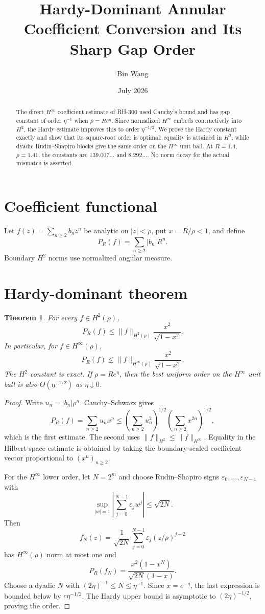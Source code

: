 \documentclass[11pt]{article}
\title{Hardy-Dominant Annular Coefficient Conversion and Its Sharp Gap Order}
\author{Bin Wang}\date{July 2026}
\newtheorem{theorem}{Theorem}[section]
\theoremstyle{remark}\newtheorem{remark}[theorem]{Remark}
\begin{document}
\maketitle
\begin{abstract}
The direct $H^\infty$ coefficient estimate of RH-300 used Cauchy's bound and
has gap constant of order $\eta^{-1}$ when $\rho=Re^\eta$.  Since normalized
$H^\infty$ embeds contractively into $H^2$, the Hardy estimate improves this
to order $\eta^{-1/2}$.  We prove the Hardy constant exactly and show that
its square-root order is optimal: equality is attained in $H^2$, while
dyadic Rudin--Shapiro blocks give the same order on the $H^\infty$ unit ball.
At $R=1.4$, $\rho=1.41$, the constants are $139.007\ldots$ and
$8.292\ldots$.  No norm decay for the actual mismatch is asserted.
\end{abstract}

\section{Coefficient functional}
Let $f(z)=\sum_{n\ge2}b_nz^n$ be analytic on $|z|<\rho$, put
$x=R/\rho<1$, and define
\[
 P_R(f)=\sum_{n\ge2}|b_n|R^n.
\]
Boundary $H^2$ norms use normalized angular measure.

\section{Hardy-dominant theorem}
\begin{theorem}\label{thm:hardy}
For every $f\in H^2(\rho)$,
\[
 P_R(f)\le
 \|f\|_{H^2(\rho)}\frac{x^2}{\sqrt{1-x^2}}.
\]
In particular, for $f\in H^\infty(\rho)$,
\[
 P_R(f)\le
 \|f\|_{H^\infty(\rho)}\frac{x^2}{\sqrt{1-x^2}}.
\]
The $H^2$ constant is exact.  If $\rho=Re^\eta$, then the best uniform
order on the $H^\infty$ unit ball is also $\Theta(\eta^{-1/2})$ as
$\eta\downarrow0$.
\end{theorem}
\begin{proof}
Write $u_n=|b_n|\rho^n$.  Cauchy--Schwarz gives
\[
 P_R(f)=\sum_{n\ge2}u_nx^n
 \le\left(\sum_{n\ge2}u_n^2\right)^{1/2}
 \left(\sum_{n\ge2}x^{2n}\right)^{1/2},
\]
which is the first estimate.  The second uses
$\|f\|_{H^2}\le\|f\|_{H^\infty}$.  Equality in the Hilbert-space estimate
is obtained by taking the boundary-scaled coefficient vector proportional
to $(x^n)_{n\ge2}$.

For the $H^\infty$ lower order, let $N=2^m$ and choose Rudin--Shapiro signs
$\varepsilon_0,\ldots,\varepsilon_{N-1}$ with
\[
 \sup_{|w|=1}\left|\sum_{j=0}^{N-1}\varepsilon_jw^j\right|
 \le\sqrt{2N}.
\]
Then
\[
 f_N(z)=\frac1{\sqrt{2N}}
 \sum_{j=0}^{N-1}\varepsilon_j(z/\rho)^{j+2}
\]
has $H^\infty(\rho)$ norm at most one and
\[
 P_R(f_N)=
 \frac{x^2(1-x^N)}{\sqrt{2N}(1-x)}.
\]
Choose a dyadic $N$ with $(2\eta)^{-1}\le N\le\eta^{-1}$.  Since
$x=e^{-\eta}$, the last expression is bounded below by
$c\eta^{-1/2}$.  The Hardy upper bound is asymptotic to
$(2\eta)^{-1/2}$, proving the order.
\end{proof}
\end{document}
